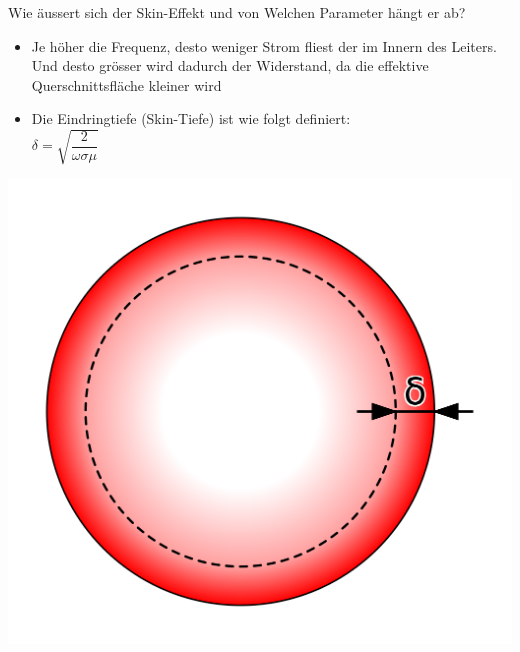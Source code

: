 \begin{karte}{Wie äussert sich der Skin-Effekt und von Welchen Parameter hängt er ab?}
	\begin{minipage}{0.6\textwidth}
		\begin{itemize}
			\item Je höher die Frequenz, desto weniger Strom fliest der im Innern des Leiters. Und desto grösser wird dadurch der Widerstand, da die effektive Querschnittsfläche kleiner wird
			\item Die Eindringtiefe (Skin-Tiefe) ist wie folgt definiert:\\[5pt]
			\large
			$ \delta=\sqrt{\dfrac{2}{\omega \sigma \mu}} $
		\end{itemize}
	\end{minipage}
	\begin{minipage}{0.39\textwidth}
		\includegraphics[width=\textwidth]{bilder/2_SkinEfekt.png}
	\end{minipage}
	
\end{karte}

